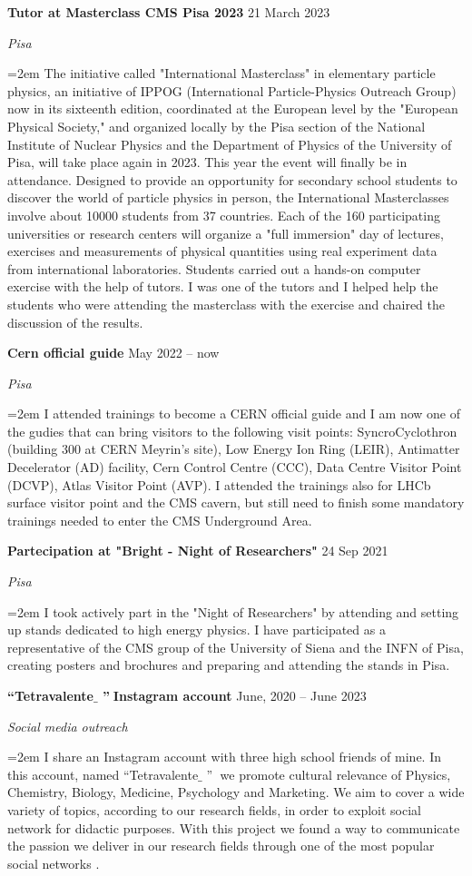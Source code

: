 \documentclass[paper=a4,fontsize=12pt]{article} %
\newcommand{\openquote}{``}
\newcommand{\closequote}{''}
\newcommand{\sepspacesmall}{\vspace*{0.3em}}
\newcommand{\EducationEntry}[4]{
	\noindent \textbf{#1} \hfill      %
	{#2} \par  %
	\noindent \textit{#3} \par        %
	\noindent\hangindent=2em\hangafter=0 \small #4 %
	\normalsize \par}
\begin{document}
     \sepspacesmall
     \EducationEntry{Tutor at Masterclass CMS Pisa 2023}{21 March 2023}{Pisa}{The initiative called "International Masterclass" in elementary particle physics, an initiative of IPPOG (International Particle-Physics Outreach Group) now in its sixteenth edition, coordinated at the European level by the "European Physical Society," and organized locally by the Pisa section of the National Institute of Nuclear Physics and the Department of Physics of the University of Pisa, will take place again in 2023. This year the event will finally be in attendance. Designed to provide an opportunity for secondary school students to discover the world of particle physics in person, the International Masterclasses involve about 10000 students from 37 countries. Each of the 160 participating universities or research centers will organize a "full immersion" day of lectures, exercises and measurements of physical quantities using real experiment data from international laboratories. Students carried out a hands-on computer exercise with the help of tutors. I was one of the tutors and I helped help the students who were attending the masterclass with the exercise and chaired the discussion of the results. \cite{masterclasspisa}}
     \sepspacesmall
     \EducationEntry{Cern official guide}{May 2022 -- now}{Pisa}{I attended trainings to become a CERN official guide and I am now one of the gudies that can bring visitors to the following visit points: SyncroCyclothron (building 300 at CERN Meyrin's site), Low Energy Ion Ring (LEIR), Antimatter Decelerator (AD) facility, Cern Control Centre (CCC), Data Centre Visitor Point (DCVP), Atlas Visitor Point (AVP). I attended the trainings also for LHCb surface visitor point and the CMS cavern, but still need to finish some mandatory trainings needed to enter the CMS Underground Area.}
     \sepspacesmall
    \EducationEntry{Partecipation at "Bright - Night of Researchers" }{24 Sep 2021}{Pisa}{I took actively part in the "Night of Researchers" by attending and setting up stands dedicated to high energy physics. I have participated as a representative of the CMS group of the University of Siena and the INFN of Pisa, creating posters and brochures and preparing and attending the stands in Pisa.}
     \sepspacesmall
	\EducationEntry{\openquote Tetravalente$\_$ \closequote $\;$Instagram account}{June, 2020 -- June 2023}{Social media outreach}{
	I share an Instagram account with three high school friends of mine. In this account, named \openquote Tetravalente$\_$ \closequote $\;$ we promote cultural relevance of Physics, Chemistry, Biology, Medicine, Psychology and Marketing. We aim to cover a wide variety of topics, according to our research fields, in order to exploit social network for didactic purposes. With this project we found a way to communicate the passion we deliver in our research fields through one of the most popular social networks \cite{tetravalente}.\\}
\end{document}
